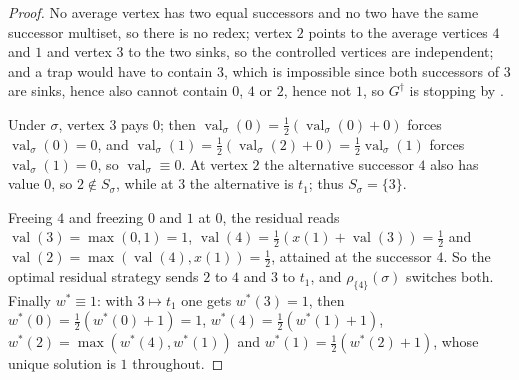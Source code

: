 \documentclass[11pt]{article}
\theoremstyle{plain}
\theoremstyle{definition}
\DeclareMathOperator{\val}{val}
\begin{document}
\begin{proof}
No average vertex has two equal successors and no two have the same
successor multiset, so there is no redex; vertex $2$ points to the
average vertices $4$ and $1$ and vertex $3$ to the two sinks, so the
controlled vertices are independent; and a trap would have to contain
$3$, which is impossible since both successors of $3$ are sinks, hence
also cannot contain $0$, $4$ or $2$, hence not $1$, so $G^{\dagger}$ is
stopping by .

Under $\sigma$, vertex $3$ pays $0$; then $\val_\sigma(0)=
\frac12(\val_\sigma(0)+0)$ forces $\val_\sigma(0)=0$, and
$\val_\sigma(1)=\frac12(\val_\sigma(2)+0)=\frac12\val_\sigma(1)$ forces
$\val_\sigma(1)=0$, so $\val_\sigma\equiv0$. At vertex $2$ the
alternative successor $4$ also has value $0$, so $2\notin S_\sigma$,
while at $3$ the alternative is $t_1$; thus $S_\sigma=\{3\}$.

Freeing $4$ and freezing $0$ and $1$ at $0$, the residual reads
$\val(3)=\max(0,1)=1$, $\val(4)=\frac12(x(1)+\val(3))=\frac12$ and
$\val(2)=\max(\val(4),x(1))=\frac12$, attained at the successor $4$. So
the optimal residual strategy sends $2$ to $4$ and $3$ to $t_1$, and
$\rho_{\{4\}}(\sigma)$ switches both. Finally $w^\ast\equiv1$: with
$3\mapsto t_1$ one gets $w^\ast(3)=1$, then $w^\ast(0)=\frac12(w^\ast(0)+1)=1$,
$w^\ast(4)=\frac12(w^\ast(1)+1)$, $w^\ast(2)=\max(w^\ast(4),w^\ast(1))$ and
$w^\ast(1)=\frac12(w^\ast(2)+1)$, whose unique solution is $1$ throughout.
\end{proof}
\end{document}
